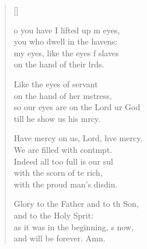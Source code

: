 \settowidth{\versewidth}{so our eyes are on the Lord our God *}
\begin{verse}[\versewidth]
  \begin{patverse}
o you have I lifted up m eyes,\Med\\
you who dwell in the havens:\\
my eyes, like the eyes f slaves\Med\\
on the hand of their lrds.

Like the eyes of  servant\Med\\
on the hand of her m\pointup{\i}stress,\\
so our eyes are on the Lord ur God\Med\\
till he show us his mrcy.

Have mercy on us, Lord, hve mercy.\Med\\
We are filled with contmpt.\\
Indeed all too full is our sul\Flex\\
with the scorn of te rich,\Med\\
with the proud man’s disdin.

Glory to the Father and to th Son,\Med\\
and to the Holy Sp\pointup{\i}rit:\\
as it was in the beginning, \pointup{\i}s now,\Med\\
and will be forever. Amn. 
  \end{patverse}
\end{verse}
